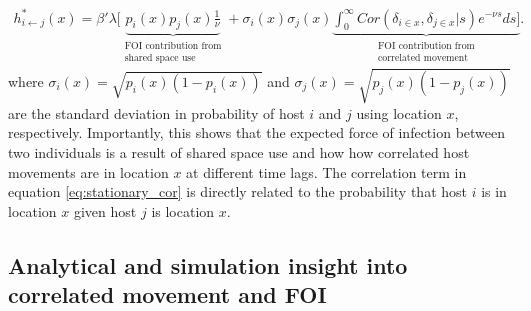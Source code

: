 \documentclass[letterpaper]{article}
\begin{document}
\begin{equation}
    \begin{aligned}
    h^*_{i \leftarrow j}(x) = \beta' \lambda [ \underbrace{p_i(x)p_j(x) \frac{1}{\nu}}_{\substack{\text{FOI contribution from} \\ \text{shared space use}}} + \sigma_i(x) \sigma_j(x) \underbrace{\int_{0}^{\infty} Cor(\delta_{i \in x}, \delta_{j \in x} | s) e^{-\nu s} ds]}_{\substack{\text{FOI contribution from} \\ \text{correlated movement}}}.
    \end{aligned}
    \label{eq:stationary_cor}
\end{equation}
where $\sigma_i(x) = \sqrt{p_i(x)(1 - p_i(x))}$  and $\sigma_j(x) = \sqrt{p_j(x)(1 - p_j(x))}$ are the standard deviation in probability of host $i$ and $j$ using location $x$, respectively.  Importantly, this shows that the expected force of infection between two individuals is a result of shared space use and how how correlated host movements are in location $x$ at different time lags.  The correlation term in equation \ref{eq:stationary_cor} is directly related to the probability that host $i$ is in location $x$ given host $j$ is location $x$. 

\subsection*{Analytical and simulation insight into correlated movement and FOI}
\end{document}
